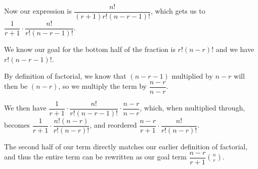 \documentclass[12pt]{article}
\begin{document}
\begin{enumerate}
Now our expression is $\dfrac{n!}{(r+1)r!(n - r -1 )!}$, which gets us to $\dfrac{1}{r+1} \cdot
\dfrac{n!}{r!(n - r -1 )! }$.

We know our goal for the bottom half of the fraction is $r!(n-r)!$ and we have $r!(n - r - 1)!$.

By definition of factorial, we know that $(n - r - 1)$ multiplied by $n - r$ will then be $(n - r)$, so we
multiply the term by $\dfrac{n-r}{n-r}$.

We then have $\dfrac{1}{r+1} \cdot \dfrac{n!}{r!(n - r -1 )! } \cdot \dfrac{n-r}{n-r}$, which, when multiplied through, becomes $\dfrac{1}{r+1} \cdot \dfrac{n!(n-r)}{r!(n-r)!}$, and reordered
$\dfrac{n-r}{r+1} \cdot \dfrac{n!}{r!(n-r)!}$.

The second half of our term directly matches our earlier definition of factorial, and thus the entire term can
be rewritten as our goal term $\dfrac{n-r}{r+1} \displaystyle{n \choose r}$.
\end{enumerate}
\end{document}
